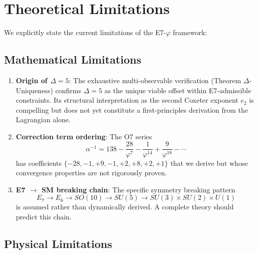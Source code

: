 \documentclass[11pt,a4paper]{article}
\begin{document}
\section{Theoretical Limitations}
\label{sec:limitations}

We explicitly state the current limitations of the E7-$\varphi$ framework:

\subsection{Mathematical Limitations}

\begin{enumerate}
\item \textbf{Origin of $\Delta = 5$}: The exhaustive multi-observable verification (Theorem $\Delta$-Uniqueness) confirms $\Delta = 5$ as the unique viable offset within E7-admissible constraints. Its structural interpretation as the second Coxeter exponent $e_2$ is compelling but does not yet constitute a first-principles derivation from the Lagrangian alone.

\item \textbf{Correction term ordering}: The O7 series
\[
\alpha^{-1} = 138 - \frac{28}{\varphi^7} - \frac{1}{\varphi^{14}} + \frac{9}{\varphi^{18}} - \cdots
\]
has coefficients $\{-28, -1, +9, -1, +2, +8, +2, +1\}$ that we derive but whose convergence properties are not rigorously proven.

\item \textbf{E7 $\to$ SM breaking chain}: The specific symmetry breaking pattern
\[
E_7 \to E_6 \to SO(10) \to SU(5) \to SU(3) \times SU(2) \times U(1)
\]
is assumed rather than dynamically derived. A complete theory should predict this chain.
\end{enumerate}

\subsection{Physical Limitations}
\end{document}

